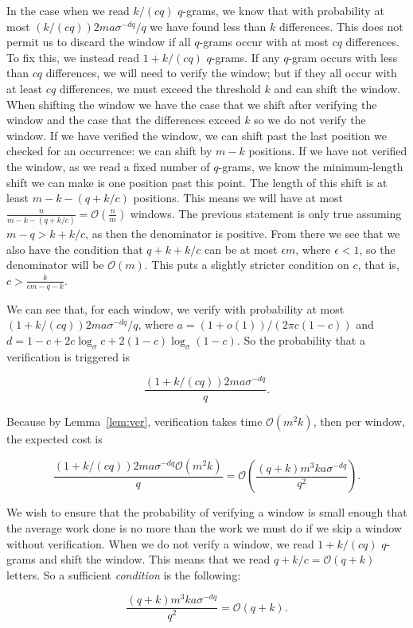 \documentclass[runningheads, envcountsame, a4paper]{llncs}\usepackage{etex}
\newcommand{\cO}{\mathcal{O}}
\begin{document}
In the case when we read $k/(cq)$ $q$-grams, we know that with probability at most $(k/(cq))2ma\sigma^{-dq}/q$ we have found less than $k$ differences. This does not permit us to discard the window if all $q$-grams occur with at most $cq$ differences. To fix this, we instead read $1 + k/(cq)$ $q$-grams. If any $q$-gram occurs with less than $cq$ differences, we will need to verify the window; but if they all occur with at least $cq$ differences, we must exceed the threshold $k$ and can shift the window. When shifting the window we have the case that we shift after verifying the window and the case that the differences exceed $k$ so we do not verify the window. If we have verified the window, we can shift past the last position we checked for an occurrence: we can shift by $m-k$ positions. If we have not verified the window, as we read a fixed number of $q$-grams, we know the minimum-length shift we can make is one position past this point. The length of this shift is at least $m-k-(q+k/c)$ positions. This 
means 
we will have at most $\frac{n}{m-k-(q+k/c)}= \cO(\frac{n}{m})$ windows. The previous statement is only true assuming $m-q>k+k/c$, as then the denominator is positive. From there we see that we also have the condition that $q + k + k/c$ can be at most $\epsilon m$, 
where $\epsilon < 1$, so the denominator will be $\cO(m)$. This puts a slightly stricter condition on $c$, that is, $c> \frac{k}{\epsilon m -q -k}$.

We can see that, for each window, we verify with probability at most $(1 + k/(cq))2ma\sigma^{-dq}/q$, where $a = (1+o(1))/(2\pi c(1-c))$ 
and $d = 1 - c + 2c \log_\sigma c + 2(1 - c) \log_\sigma (1 - c)$. So the probability that a verification is triggered is

$$\frac{(1+k/(cq))2ma\sigma^{-dq}}{q}.$$

\noindent Because by Lemma~\ref{lem:ver}, verification takes time $\cO(m^2k)$, then per window, the expected cost is

$$\frac{(1+k/(cq))2ma\sigma^{-dq}\cO(m^2k)}{q} = \cO(\frac{(q+k)m^3ka\sigma^{-dq}}{q^2}).$$

\noindent We wish to ensure that the probability of verifying a window is small enough that the average work done is no more than the work we must do if we skip a window without verification. When we do not verify a window, we read $1 + k/(cq)$ $q$-grams and shift the window. This means that we read $q + k/c = \cO(q + k)$ letters. So a sufficient {\em condition} is the following:

$$\frac{(q+k)m^3ka\sigma^{-dq}}{q^2} = \cO(q + k).$$
\end{document}

